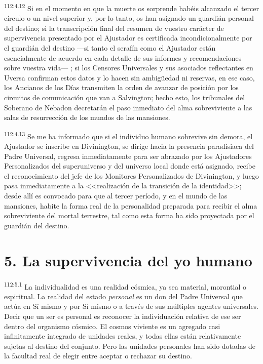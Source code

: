 \par
\textsuperscript{112:4.12} Si en el momento en que la muerte os sorprende habéis alcanzado el tercer círculo o un nivel superior y, por lo tanto, os han asignado un guardián personal del destino; si la transcripción final del resumen de vuestro carácter de supervivencia presentado por el Ajustador es certificada incondicionalmente por el guardián del destino ---si tanto el serafín como el Ajustador están esencialmente de acuerdo en cada detalle de sus informes y recomendaciones sobre vuestra vida--- ; si los Censores Universales y sus asociados reflectantes en Uversa confirman estos datos y lo hacen sin ambig\"uedad ni reservas, en ese caso, los Ancianos de los Días transmiten la orden de avanzar de posición por los circuitos de comunicación que van a Salvington; hecho esto, los tribunales del Soberano de Nebadon decretarán el paso inmediato del alma sobreviviente a las salas de resurrección de los mundos de las mansiones.

\par
\textsuperscript{112:4.13} Se me ha informado que si el individuo humano sobrevive sin demora, el Ajustador se inscribe en Divinington, se dirige hacia la presencia paradisiaca del Padre Universal, regresa inmediatamente para ser abrazado por los Ajustadores Personalizados del superuniverso y del universo local donde está asignado, recibe el reconocimiento del jefe de los Monitores Personalizados de Divinington, y luego pasa inmediatamente a la <<realización de la transición de la identidad>>; desde allí es convocado para que al tercer período, y en el mundo de las mansiones, habite la forma real de la personalidad preparada para recibir el alma sobreviviente del mortal terrestre, tal como esta forma ha sido proyectada por el guardián del destino.

\section*{5. La supervivencia del yo humano}
\par
\textsuperscript{112:5.1} La individualidad es una realidad cósmica, ya sea material, morontial o espiritual. La realidad del estado \textit{personal} es un don del Padre Universal que actúa en Sí mismo y por Sí mismo o a través de sus múltiples agentes universales. Decir que un ser es personal es reconocer la individuación relativa de ese ser dentro del organismo cósmico. El cosmos viviente es un agregado casi infinitamente integrado de unidades reales, y todas ellas están relativamente sujetas al destino del conjunto. Pero las unidades personales han sido dotadas de la facultad real de elegir entre aceptar o rechazar su destino.

